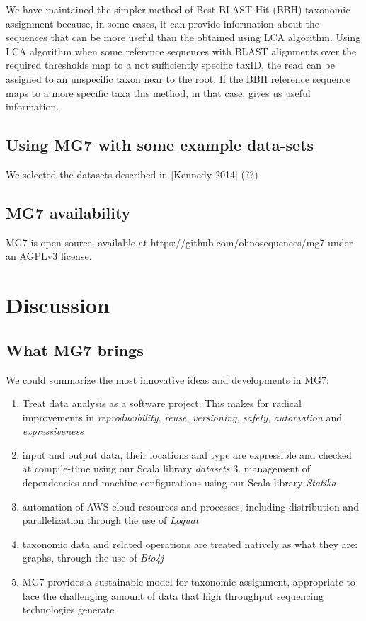 \documentclass{frontiersSCNS} %
\providecommand{\tightlist}{%
\setlength{\itemsep}{0pt}\setlength{\parskip}{0pt}}
\begin{document}
We have maintained the simpler method of Best BLAST Hit (BBH) taxonomic
assignment because, in some cases, it can provide information about the
sequences that can be more useful than the obtained using LCA algorithm.
Using LCA algorithm when some reference sequences with BLAST alignments
over the required thresholds map to a not sufficiently specific taxID,
the read can be assigned to an unspecific taxon near to the root. If the
BBH reference sequence maps to a more specific taxa this method, in that
case, gives us useful information.

\subsection{Using MG7 with some example
data-sets}\label{using-mg7-with-some-example-data-sets}

We selected the datasets described in {[}Kennedy-2014{]} (??)

\subsection{MG7 availability}\label{mg7-availability}

MG7 is open source, available at https://github.com/ohnosequences/mg7
under an \href{http://www.gnu.org/licenses/agpl-3.0.en.html}{AGPLv3}
license.

\section{Discussion}\label{discussion}

\subsection{What MG7 brings}\label{what-mg7-brings}

We could summarize the most innovative ideas and developments in MG7:

\begin{enumerate}
\def\labelenumi{\arabic{enumi}.}
\tightlist
\item
  Treat data analysis as a software project. This makes for radical
  improvements in \emph{reproducibility}, \emph{reuse},
  \emph{versioning}, \emph{safety}, \emph{automation} and
  \emph{expressiveness}
\item
  input and output data, their locations and type are expressible and
  checked at compile-time using our Scala library \emph{datasets} ­3.
  management of dependencies and machine configurations using our Scala
  library \emph{Statika}
\item
  automation of AWS cloud resources and processes, including
  distribution and parallelization through the use of \emph{Loquat}
\item
  taxonomic data and related operations are treated natively as what
  they are: graphs, through the use of \emph{Bio4j}
\item
  MG7 provides a sustainable model for taxonomic assignment, appropriate
  to face the challenging amount of data that high throughput sequencing
  technologies generate
\end{enumerate}
\end{document}
